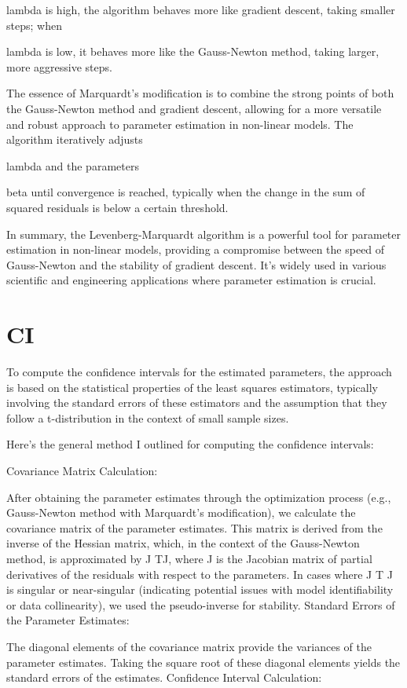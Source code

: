\documentclass[17pt]{extarticle} %
\begin{document}
lambda is high, the algorithm behaves more like gradient descent, taking smaller steps; when 

lambda is low, it behaves more like the Gauss-Newton method, taking larger, more aggressive steps.

The essence of Marquardt's modification is to combine the strong points of both the Gauss-Newton method and gradient descent, allowing for a more versatile and robust approach to parameter estimation in non-linear models. The algorithm iteratively adjusts 

lambda and the parameters 

beta until convergence is reached, typically when the change in the sum of squared residuals is below a certain threshold.

In summary, the Levenberg-Marquardt algorithm is a powerful tool for parameter estimation in non-linear models, providing a compromise between the speed of Gauss-Newton and the stability of gradient descent. It's widely used in various scientific and engineering applications where parameter estimation is crucial.
\section*{CI}
To compute the confidence intervals for the estimated parameters, the approach is based on the statistical properties of the least squares estimators, typically involving the standard errors of these estimators and the assumption that they follow a t-distribution in the context of small sample sizes.

Here’s the general method I outlined for computing the confidence intervals:

Covariance Matrix Calculation:

After obtaining the parameter estimates through the optimization process (e.g., Gauss-Newton method with Marquardt's modification), we calculate the covariance matrix of the parameter estimates. This matrix is derived from the inverse of the Hessian matrix, which, in the context of the Gauss-Newton method, is approximated by 
J TJ, where J is the Jacobian matrix of partial derivatives of the residuals with respect to the parameters.
In cases where J T
J is singular or near-singular (indicating potential issues with model identifiability or data collinearity), we used the pseudo-inverse for stability.
Standard Errors of the Parameter Estimates:

The diagonal elements of the covariance matrix provide the variances of the parameter estimates. Taking the square root of these diagonal elements yields the standard errors of the estimates.
Confidence Interval Calculation:
\end{document}
